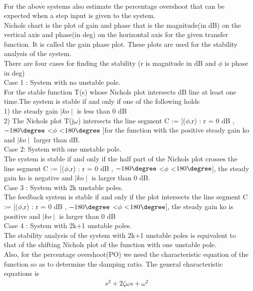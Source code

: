 \begin{enumerate}[label=\thesection.\arabic*.,ref=\thesection.\theenumi]
\begin{align}
\end{align}
For the above systems also estimate the percentage overshoot that can be expected when a step input is given to the system.
\\
\solution 
Nichols chart is the plot of gain and phase that is the magnitude(in dB) on the vertical axis and phase(in deg) on the horizontal axis for the given transfer function. It is called the gain phase plot. These plots are used for the stability analysis of the system.
\\
There are four cases for finding the stability (r is magnitude in dB and $\phi$ is phase in deg)
\\
Case 1 : System with no unstable pole.
\\
For the stable function T(s) whose Nichols plot intersects dB line at least one time.The system is stable if and only if one of the following holds
\\
1) the steady gain $\mid ko\mid$ is less than 0 dB
\\
2) The Nichols plot T(j$\omega$) intersects the line segment C := [($\phi$,r) : r = 0 dB , $-180\degree$ \textless $\phi$ \textless $180\degree$ ]for the function with the positive steady gain ko and $\mid ko\mid$ larger than dB.
\\
Case 2: System with one unstable pole.
\\
The system is stable if and only if the half part of the Nichols plot crosses the line segment  C := [($\phi$,r) : r = 0 dB , $-180\degree$ \textless $\phi$ \textless $180\degree$], the steady gain ko is negative and $\mid ko\mid$ is larger than 0 dB.
\\
Case 3 : System with 2k unstable poles.
\\
The feedback system is stable if and only if the plot intersects the line segment C := [($\phi$,r) : r = 0 dB , $-180\degree$ \textless $\phi$ \textless $180\degree$], the steady gain ko is positive and $\mid ko\mid$  is larger than
0 dB
\\
Case 4 : System with 2k+1 unstable poles.
\\
The stability analysis of the system with 2k+1 unstable poles is equivalent to
that of the shifting Nichols plot of the function with one unstable pole.
\\
Also, for the percentage overshoot(PO) we need the characteristic equation of the function so as to determine the damping ratio.
The general characteristic equations is 
\begin{align}
 s^2 + 2\zeta \omega  s + \omega ^2 

\end{align}
\end{enumerate}
